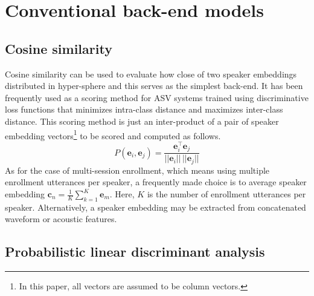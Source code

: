\documentclass{article}
\begin{document}
\section{Conventional back-end models}
\vspace{-1mm}
\subsection{Cosine similarity}
\vspace{-1mm}

Cosine similarity can be used to evaluate how close of two speaker embeddings distributed in hyper-sphere and this serves as the simplest back-end. It has been frequently used as a scoring method for ASV systems trained using discriminative loss functions \cite{Li2017-DS, Liu2017-Angular, Wang2018-LMCL} that minimizes intra-class distance and maximizes inter-class distance. This scoring method is just an inter-product of a pair of speaker embedding vectors\footnote{In this paper, all vectors are assumed to be column vectors.} to be scored and computed as follows.
\begin{equation}
\label{cosine}
P(\boldsymbol{e}_i, \boldsymbol{e}_j)=\frac{\boldsymbol{e}_i^\top \boldsymbol{e}_j}{||\boldsymbol{e}_i||\, ||\boldsymbol{e}_j||}
\end{equation}
As for the case of multi-session enrollment, which means using multiple enrollment utterances per speaker, 
a frequently made choice is to average speaker embedding $\boldsymbol{c}_n = \frac{1}{K}\sum_{k=1}^K \boldsymbol{e}_m$. Here, $K$ is the number of enrollment utterances per speaker. Alternatively, a speaker embedding may be extracted from concatenated waveform or acoustic features.
\vspace{-1mm}


\subsection{Probabilistic linear discriminant analysis}
\vspace{-1mm}
\end{document}
